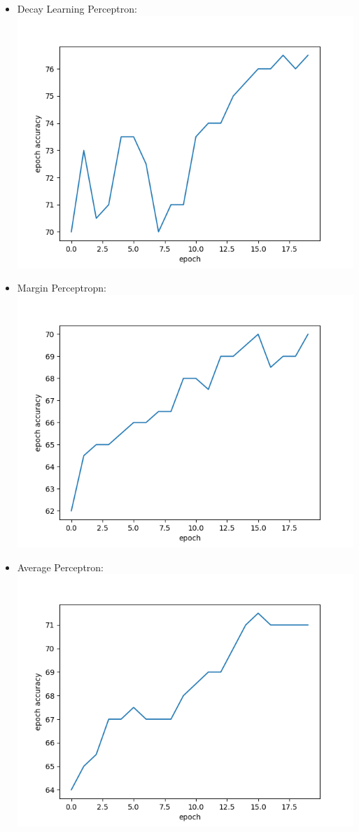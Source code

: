\begin{enumerate}
\begin{enumerate}
\begin{itemize}
      \item Decay Learning Perceptron:\\ \includegraphics{decayLP.png}
      \item Margin Perceptropn:\\ \includegraphics{marginP.png}
      \item Average Perceptron:\\ \includegraphics{avgP.png}

\end{itemize}
\end{enumerate}
\end{enumerate}
